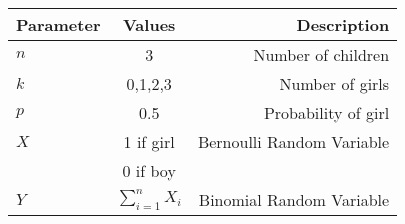 \begin{tabular}{|l|c|r|}
    \hline
    Parameter & Values & Description\\
    \hline
    $n$ & 3 & Number of children\\
    \hline
    $k$ & 0,1,2,3 & Number of girls\\
    \hline
    $p$ & 0.5 & Probability of girl\\
    \hline
    $X$ & 1 if girl & Bernoulli Random Variable\\
    {} & 0 if boy & {}\\
    \hline
    $Y$ & $\sum_{i=1}^nX_i$ & Binomial Random Variable\\
    \hline
\end{tabular}
